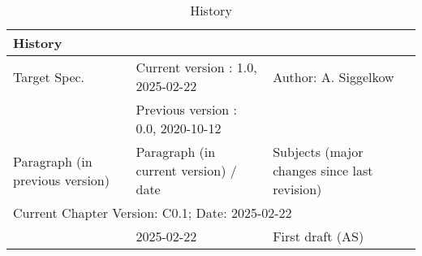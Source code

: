 \begin{table}[H]
\caption{History}
\label{tab:arch_history01a}
\centering
\begin{tabularx}{\textwidth}{|X |X |X |}
  \hline
  \multicolumn{3}{|l|}{History} \\
  \hline
  \multicolumn{1}{|l}{Target Spec.} & \multicolumn{1}{l}{Current version : 1.0, 2025-02-22} & \multicolumn{1}{l|}{Author: A. Siggelkow}\\
  \multicolumn{1}{|l}{ } & \multicolumn{1}{l}{Previous version : 0.0, 2020-10-12} & \multicolumn{1}{l|}{ }\\
  \hline
  \hline
  Paragraph (in previous version) & Paragraph (in current version) / date & Subjects (major changes since last revision) \\
  \hline
  \hline
  \multicolumn{3}{|l|}{Current Chapter Version: C0.1; Date: 2025-02-22} \\
  \hline
  & 2025-02-22 & First draft (AS) \\
  \hline
\end{tabularx}
\end{table}
